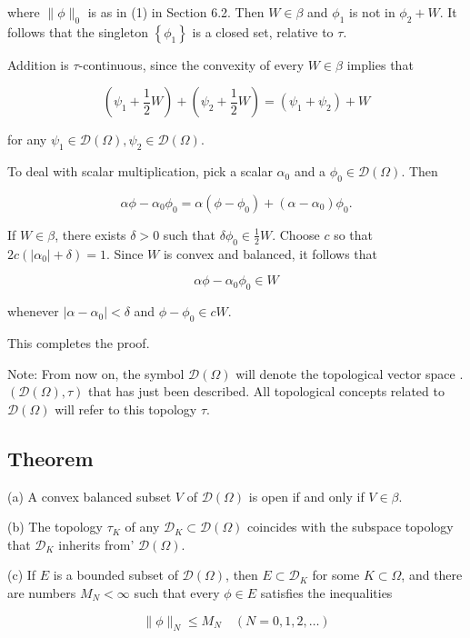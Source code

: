 \documentclass[10pt]{article}
\begin{document}
where $\|\phi\|_{0}$ is as in (1) in Section 6.2. Then $W \in \beta$ and $\phi_{1}$ is not in $\phi_{2}+W$. It follows that the singleton $\left\{\phi_{1}\right\}$ is a closed set, relative to $\tau$.

Addition is $\tau$-continuous, since the convexity of every $W \in \beta$ implies that

$$
\left(\psi_{1}+\frac{1}{2} W\right)+\left(\psi_{2}+\frac{1}{2} W\right)=\left(\psi_{1}+\psi_{2}\right)+W
$$

for any $\psi_{1} \in \mathscr{D}(\Omega), \psi_{2} \in \mathscr{D}(\Omega)$.

To deal with scalar multiplication, pick a scalar $\alpha_{0}$ and a $\phi_{0} \in \mathscr{D}(\Omega)$. Then

$$
\alpha \phi-\alpha_{0} \phi_{0}=\alpha\left(\phi-\phi_{0}\right)+\left(\alpha-\alpha_{0}\right) \phi_{0} .
$$

If $W \in \beta$, there exists $\delta>0$ such that $\delta \phi_{0} \in \frac{1}{2} W$. Choose $c$ so that $2 c\left(\left|\alpha_{0}\right|+\delta\right)=1$. Since $W$ is convex and balanced, it follows that

$$
\alpha \phi-\alpha_{0} \phi_{0} \in W
$$

whenever $\left|\alpha-\alpha_{0}\right|<\delta$ and $\phi-\phi_{0} \in c W$.

This completes the proof.

Note: From now on, the symbol $\mathscr{D}(\Omega)$ will denote the topological vector space . $(\mathscr{D}(\Omega), \tau)$ that has just been described. All topological concepts related to $\mathscr{D}(\Omega)$ will refer to this topology $\tau$.

\subsection{Theorem}
(a) A convex balanced subset $V$ of $\mathscr{D}(\Omega)$ is open if and only if $V \in \beta$.

(b) The topology $\tau_{K}$ of any $\mathscr{D}_{K} \subset \mathscr{D}(\Omega)$ coincides with the subspace topology that $\mathscr{D}_{K}$ inherits from' $\mathscr{D}(\Omega)$.

(c) If $E$ is a bounded subset of $\mathscr{D}(\Omega)$, then $E \subset \mathscr{D}_{K}$ for some $K \subset \Omega$, and there are numbers $M_{N}<\infty$ such that every $\phi \in E$ satisfies the inequalities

$$
\|\phi\|_{N} \leq M_{N} \quad(N=0,1,2, \ldots)
$$
\end{document}
